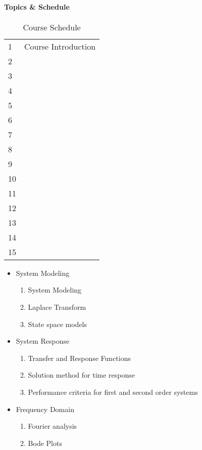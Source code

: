 \documentclass[11pt, reqno]{article}   	%
\begin{document}
\paragraph{Topics \& Schedule}
\begin{table}[h]
\begin{tabular}{lc}
    1 & Course Introduction \\
    2 & \\
    3 & \\ 
    4 & \\
    5 & \\
    6 & \\
    7 & \\
    8 & \\
    9 & \\
    10 & \\
    11 & \\
    12 & \\
    13 & \\
    14 & \\
    15 & \\
\end{tabular}
\caption{Course Schedule}
\end{table}

\begin{itemize}
    \item System Modeling
        \begin{enumerate}
            \item System Modeling
            \item Laplace Transform
            \item State space models
        \end{enumerate}
  
    \item System Response
        \begin{enumerate}
            \item Transfer and Response Functions
            \item Solution method for time response
            \item Performance criteria for first and second order systems
        \end{enumerate}
    \item Frequency Domain
        \begin{enumerate}
            \item Fourier analysis
            \item Bode Plots
        \end{enumerate}
\end{itemize}
\end{document}
